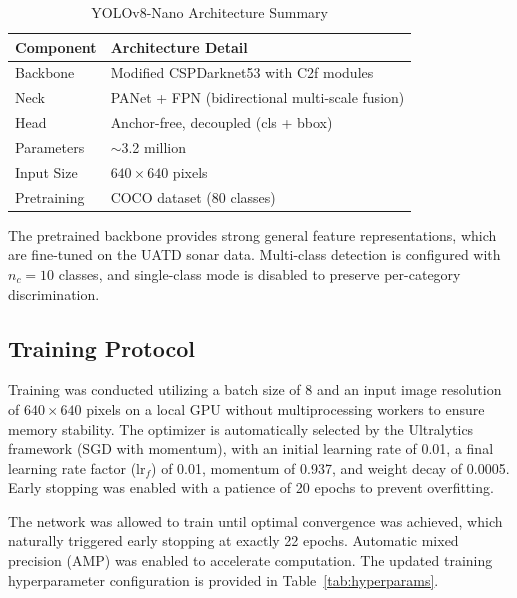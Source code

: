 \documentclass[conference]{IEEEtran}
\begin{document}
\begin{table}[!t]
\caption{YOLOv8-Nano Architecture Summary}
\label{tab:architecture}
\centering
\begin{tabular}{@{}l l@{}}
\toprule
\textbf{Component} & \textbf{Architecture Detail} \\
\midrule
Backbone    & Modified CSPDarknet53 with C2f modules \\
Neck        & PANet + FPN (bidirectional multi-scale fusion) \\
Head        & Anchor-free, decoupled (cls + bbox) \\
Parameters  & $\sim$3.2 million \\
Input Size  & $640 \times 640$ pixels \\
Pretraining & COCO dataset (80 classes) \\
\bottomrule
\end{tabular}
\end{table}

The pretrained backbone provides strong general feature representations, which are fine-tuned on the UATD sonar data. Multi-class detection is configured with $n_c = 10$ classes, and single-class mode is disabled to preserve per-category discrimination.

\subsection{Training Protocol}

Training was conducted utilizing a batch size of 8 and an input image resolution of $640 \times 640$ pixels on a local GPU without multiprocessing workers to ensure memory stability. The optimizer is automatically selected by the Ultralytics framework (SGD with momentum), with an initial learning rate of 0.01, a final learning rate factor ($\text{lr}_f$) of 0.01, momentum of 0.937, and weight decay of 0.0005. Early stopping was enabled with a patience of 20 epochs to prevent overfitting. 

The network was allowed to train until optimal convergence was achieved, which naturally triggered early stopping at exactly 22 epochs. Automatic mixed precision (AMP) was enabled to accelerate computation. The updated training hyperparameter configuration is provided in Table~\ref{tab:hyperparams}.
\end{document}
